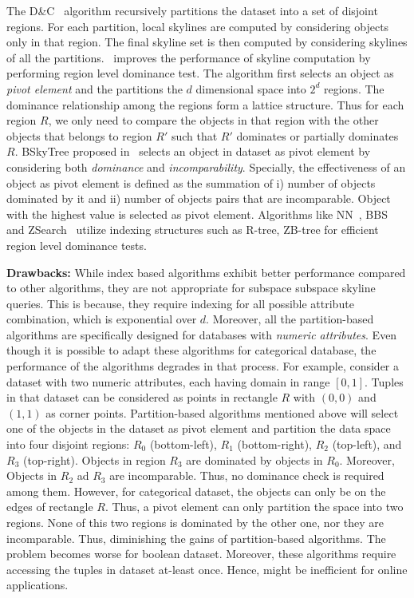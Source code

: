 \vspace{1mm}
 The D\&C~\cite{borzsony2001skyline} algorithm recursively partitions the dataset into a set of disjoint regions. For each partition, local skylines are computed by considering objects only in that region. The final skyline set is then computed by considering skylines of all the partitions.~\cite{zhang2009scalable} improves the performance of skyline computation by performing region level dominance test. The algorithm first selects an object as \textit{pivot element} and the partitions the $d$ dimensional space into $2^d$ regions. The dominance relationship among the regions form a lattice structure. Thus for each region $R$, we only need to compare the objects in that region with the other objects that belongs to region $R'$ such that $R'$ dominates or partially dominates $R$. BSkyTree proposed in~\cite{lee2014scalable} selects an object in dataset as pivot element by considering both \textit{dominance} and \textit{incomparability}. Specially, the effectiveness of an object as pivot element is defined as the summation of i) number of objects dominated by it and ii) number of objects pairs that are incomparable. Object with the highest value is selected as pivot element. Algorithms like NN~\cite{kossmann2002shooting}, BBS~\cite{papadias2003optimal} and ZSearch~\cite{lee2007approaching} utilize indexing structures such as R-tree, ZB-tree for efficient region level dominance tests.

{\bf Drawbacks:}  While index based algorithms exhibit better performance compared to other algorithms, they are not appropriate for subspace subspace skyline queries. This is because, they require indexing for all possible attribute combination, which is exponential over $d$. Moreover, all the partition-based algorithms are specifically designed for databases with {\em numeric attributes}. Even though it is possible to adapt these algorithms for categorical database, the performance of the algorithms degrades in that process. For example, consider a dataset with two numeric attributes, each having domain in range $[0, 1]$. Tuples in that dataset can be considered as points in rectangle $R$ with $(0, 0)$ and $(1, 1)$ as corner points. Partition-based algorithms mentioned above will select one of the objects in the dataset as pivot element and partition the data space into four disjoint regions: $R_0$ (bottom-left), $R_1$ (bottom-right), $R_2$ (top-left), and $R_3$ (top-right). Objects in region $R_3$ are dominated by objects in $R_0$. Moreover, Objects in $R_2$ ad $R_3$ are incomparable. Thus, no dominance check is required among them. However, for categorical dataset, the objects can only be on the edges of rectangle $R$. Thus, a pivot element can only partition the space into two regions. None of this two regions is dominated by the other one, nor they are incomparable. Thus, diminishing the gains of partition-based algorithms. The problem becomes worse for boolean dataset. Moreover, these algorithms require accessing the tuples in dataset at-least once. Hence, might be inefficient for online applications.


